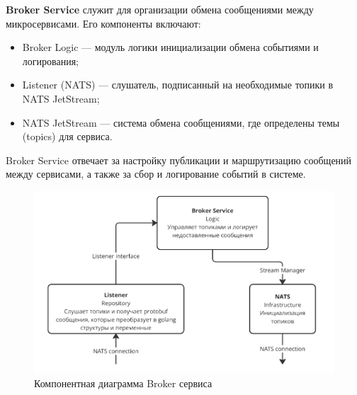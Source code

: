 \textbf{Broker Service} служит для организации обмена сообщениями между микросервисами. Его компоненты включают:
\begin{itemize}
    \item Broker Logic — модуль логики инициализации обмена событиями и логирования;
    \item Listener (NATS) — слушатель, подписанный на необходимые топики в NATS JetStream;
    \item NATS JetStream — система обмена сообщениями, где определены темы (topics) для сервиса.
\end{itemize}
\noindent Broker Service отвечает за настройку публикации и маршрутизацию сообщений между сервисами, а также за сбор и логирование событий в системе.
\begin{figure}[H]
        \centering
        \includegraphics[width=0.8\linewidth]{Images/second_chapter_backend_architecture/Picture9.png}
        \caption{Компонентная диаграмма Broker сервиса}
        \label{fig:broker-service-component-diagram}
\end{figure}

